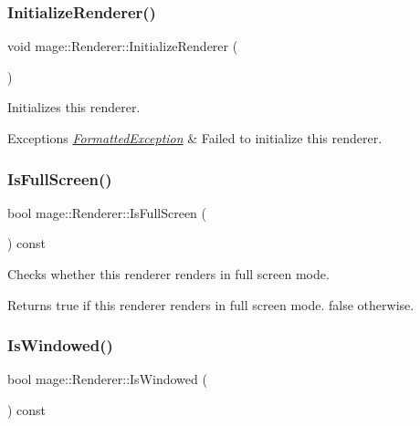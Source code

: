 \subsubsection{\texorpdfstring{Initialize\+Renderer()}{InitializeRenderer()}}
{\footnotesize\ttfamily void mage\+::\+Renderer\+::\+Initialize\+Renderer (\begin{DoxyParamCaption}{ }\end{DoxyParamCaption})\hspace{0.3cm}{\ttfamily [private]}}

Initializes this renderer.


\begin{DoxyExceptions}{Exceptions}
{\em \hyperlink{structmage_1_1_formatted_exception}{Formatted\+Exception}} & Failed to initialize this renderer. \\
\hline
\end{DoxyExceptions}
\hypertarget{classmage_1_1_renderer_a5ae3220e19c68f47a8e4d55e3ced4694}{}\label{classmage_1_1_renderer_a5ae3220e19c68f47a8e4d55e3ced4694} 
\subsubsection{\texorpdfstring{Is\+Full\+Screen()}{IsFullScreen()}}
{\footnotesize\ttfamily bool mage\+::\+Renderer\+::\+Is\+Full\+Screen (\begin{DoxyParamCaption}{ }\end{DoxyParamCaption}) const}

Checks whether this renderer renders in full screen mode.

\begin{DoxyReturn}{Returns}
{\ttfamily true} if this renderer renders in full screen mode. {\ttfamily false} otherwise. 
\end{DoxyReturn}
\hypertarget{classmage_1_1_renderer_a1de1804c1eedae7dc12435a520a10b9c}{}\label{classmage_1_1_renderer_a1de1804c1eedae7dc12435a520a10b9c} 
\subsubsection{\texorpdfstring{Is\+Windowed()}{IsWindowed()}}
{\footnotesize\ttfamily bool mage\+::\+Renderer\+::\+Is\+Windowed (\begin{DoxyParamCaption}{ }\end{DoxyParamCaption}) const}

